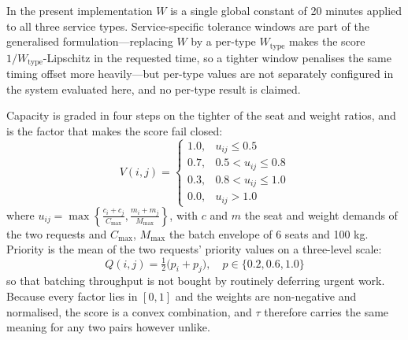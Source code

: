 \documentclass[conference]{IEEEtran}
\begin{document}
In the present implementation $W$ is a single global constant of 20 minutes applied to all three service types. Service-specific tolerance windows are part of the generalised formulation---replacing $W$ by a per-type $W_{\text{type}}$ makes the score $1/W_{\text{type}}$-Lipschitz in the requested time, so a tighter window penalises the same timing offset more heavily---but per-type values are not separately configured in the system evaluated here, and no per-type result is claimed.

Capacity is graded in four steps on the tighter of the seat and weight ratios, and is the factor that makes the score fail closed:
\begin{equation}
V(i, j) = \begin{cases}
1.0, & u_{ij} \le 0.5 \\
0.7, & 0.5 < u_{ij} \le 0.8 \\
0.3, & 0.8 < u_{ij} \le 1.0 \\
0.0, & u_{ij} > 1.0
\end{cases}
\end{equation}
where $u_{ij} = \max\left\{ \frac{c_i+c_j}{C_{\text{max}}}, \frac{m_i+m_j}{M_{\text{max}}} \right\}$, with $c$ and $m$ the seat and weight demands of the two requests and $C_{\text{max}}$, $M_{\text{max}}$ the batch envelope of 6 seats and 100 kg. Priority is the mean of the two requests' priority values on a three-level scale:
\begin{equation}
Q(i, j) = \tfrac{1}{2}\big(p_i + p_j\big), \quad p \in \{0.2, 0.6, 1.0\}
\end{equation}
so that batching throughput is not bought by routinely deferring urgent work. Because every factor lies in $[0, 1]$ and the weights are non-negative and normalised, the score is a convex combination, and $\tau$ therefore carries the same meaning for any two pairs however unlike.
\end{document}
